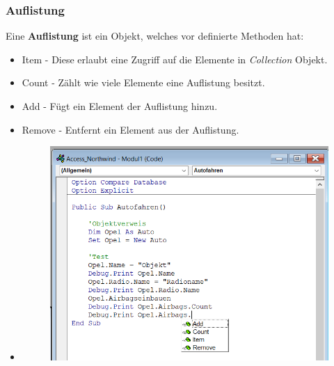 \subsubsection{Auflistung}
Eine \textbf{Auflistung} ist ein Objekt, welches vor definierte Methoden hat:
\begin{itemize}
	\item Item - Diese erlaubt eine Zugriff auf die Elemente in \textit{Collection} Objekt.
	\item Count - Zählt wie viele Elemente eine Auflistung besitzt.
	\item Add - Fügt ein Element der Auflistung hinzu.
	\item Remove - Entfernt ein Element aus der Auflistung.
	\item \begin{figure}[H]
		\centering
		\includegraphics[scale = 0.3]{attachment/chapter_2/Scc042}
		\caption{}
		\label{fig:Scc042}
	\end{figure}
\end{itemize}

